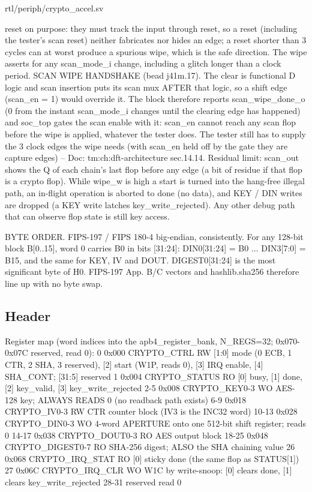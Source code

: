\begin{relocated}{rtl/periph/crypto_accel.sv}
\begin{textblock}
    reset on purpose: they must track the input through reset, so a reset (including the tester's
    scan reset) neither fabricates nor hides an edge; a reset shorter than 3 cycles can at worst
    produce a spurious wipe, which is the safe direction. The wipe asserts for any scan_mode_i
    change, including a glitch longer than a clock period.
    SCAN WIPE HANDSHAKE (bead j41m.17). The clear is functional D logic and scan insertion puts
    its scan mux AFTER that logic, so a shift edge (scan_en = 1) would override it. The block
    therefore reports scan_wipe_done_o (0 from the instant scan_mode_i changes until the
    clearing edge has happened) and soc_top gates the scan enable with it: scan_en cannot reach
    any scan flop before the wipe is applied, whatever the tester does. The tester still has to
    supply the 3 clock edges the wipe needs (with scan_en held off by the gate they are capture
    edges) -- Doc: tm:ch:dft-architecture sec.14.14. Residual limit: scan_out shows the Q of each
    chain's last flop before any edge (a bit of residue if that flop is a crypto flop).
    While wipe_w is high a start is turned into the hang-free illegal path, an in-flight
    operation is aborted to done (no data), and KEY / DIN writes are dropped (a KEY write latches
    key_write_rejected). Any other debug path that can observe flop state is still key access.

BYTE ORDER. FIPS-197 / FIPS 180-4 big-endian, consistently. For any 128-bit block B[0..15],
word 0 carries B0 in bits [31:24]: DIN0[31:24] = B0 ... DIN3[7:0] = B15, and the same for KEY,
IV and DOUT. DIGEST0[31:24] is the most significant byte of H0. FIPS-197 App. B/C vectors and
hashlib.sha256 therefore line up with no byte swap.
\end{textblock}

\subsection*{Header}

\begin{textblock}
Register map (word indices into the apb4_register_bank, N_REGS=32; 0x070-0x07C reserved, read 0):
  0    0x000 CRYPTO_CTRL     RW  [1:0] mode (0 ECB, 1 CTR, 2 SHA, 3 reserved), [2] start (W1P,
                                 reads 0), [3] IRQ enable, [4] SHA_CONT; [31:5] reserved
  1    0x004 CRYPTO_STATUS   RO  [0] busy, [1] done, [2] key_valid, [3] key_write_rejected
  2-5  0x008 CRYPTO_KEY0-3   WO  AES-128 key; ALWAYS READS 0 (no readback path exists)
  6-9  0x018 CRYPTO_IV0-3    RW  CTR counter block (IV3 is the INC32 word)
  10-13 0x028 CRYPTO_DIN0-3  WO  4-word APERTURE onto one 512-bit shift register; reads 0
  14-17 0x038 CRYPTO_DOUT0-3 RO  AES output block
  18-25 0x048 CRYPTO_DIGEST0-7 RO SHA-256 digest; ALSO the SHA chaining value
  26   0x068 CRYPTO_IRQ_STAT RO  [0] sticky done (the same flop as STATUS[1])
  27   0x06C CRYPTO_IRQ_CLR  WO  W1C by write-snoop: [0] clears done, [1] clears key_write_rejected
  28-31      reserved        read 0
\end{textblock}


\end{relocated}
